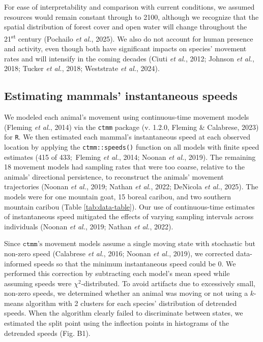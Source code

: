 \documentclass[
  12pt,
]{article}
\begin{document}
For ease of interpretability and comparison with current conditions, we assumed resources would remain constant through to 2100, although we recognize that the spatial distribution of forest cover and open water will change throughout the 21\textsuperscript{st} century (Pochailo \emph{et al.}, 2025). We also do not account for human presence and activity, even though both have significant impacts on species' movement rates and will intensify in the coming decades (Ciuti \emph{et al.}, 2012; Johnson \emph{et al.}, 2018; Tucker \emph{et al.}, 2018; Weststrate \emph{et al.}, 2024).

\subsection{Estimating mammals' instantaneous speeds}\label{estimating-mammals-instantaneous-speeds}

\noindent We modeled each animal's movement using continuous-time movement models (Fleming \emph{et al.}, 2014) via the \texttt{ctmm} package (v. 1.2.0, Fleming \& Calabrese, 2023) for \texttt{R}. We then estimated each mammal's instantaneous speed at each observed location by applying the \texttt{ctmm::speeds()} function on all models with finite speed estimates (415 of 433\(;\) Fleming \emph{et al.}, 2014; Noonan \emph{et al.}, 2019). The remaining 18 movement models had sampling rates that were too coarse, relative to the animals' directional persistence, to reconstruct the animals' movement trajectories (Noonan \emph{et al.}, 2019; Nathan \emph{et al.}, 2022; DeNicola \emph{et al.}, 2025). The models were for one mountain goat, 15 boreal caribou, and two southern mountain caribou (Table \ref{tab:data-table}). Our use of continuous-time estimates of instantaneous speed mitigated the effects of varying sampling intervals across individuals (Noonan \emph{et al.}, 2019; Nathan \emph{et al.}, 2022).

Since \(\texttt{ctmm}\text{'s}\) movement models assume a single moving state with stochastic but non-zero speed (Calabrese \emph{et al.}, 2016; Noonan \emph{et al.}, 2019), we corrected data-informed speeds so that the minimum instantaneous speed could be 0. We performed this correction by subtracting each model's mean speed while assuming speeds were \(\chi^2\)-distributed. To avoid artifacts due to excessively small, non-zero speeds, we determined whether an animal was moving or not using a \(k\)-means algorithm with 2 clusters for each species' distribution of detrended speeds. When the algorithm clearly failed to discriminate between states, we estimated the split point using the inflection points in histograms of the detrended speeds (Fig. B1).
\end{document}
